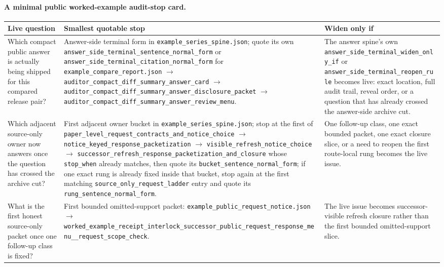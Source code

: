 \documentclass[11pt]{article}
\begin{document}
\paragraph{A minimal public worked-example audit-stop card.}
\begin{table}[t]
\centering
\small
\begin{tabularx}{\linewidth}{@{}Y Y Y@{}}
\toprule
Live question & Smallest quotable stop & Widen only if \\
\midrule
Which compact public answer is actually being shipped for this compared release pair? & Answer-side terminal form in \nolinkurl{example_series_spine.json}; quote its own \texttt{answer\_side\_terminal\_sentence\_normal\_form} or \texttt{answer\_side\_terminal\_citation\_normal\_form} for \nolinkurl{example_compare_report.json} $\to$ \texttt{auditor\_compact\_diff\_summary\_answer\_card} $\to$ \texttt{auditor\_compact\_diff\_summary\_answer\_disclosure\_packet} $\to$ \texttt{auditor\_compact\_diff\_summary\_answer\_review\_menu}. & The answer spine's own \texttt{answer\_side\_terminal\_widen\_only\_if} or \texttt{answer\_side\_terminal\_reopen\_rule} becomes live: exact location, full audit trail, reveal order, or a question that has already crossed the answer-side archive cut. \\
Which adjacent source-only owner now answers once the question has crossed the archive cut? & First adjacent owner bucket in \nolinkurl{example_series_spine.json}; stop at the first of \texttt{paper\_level\_request\_contracts\_and\_notice\_choice} $\to$ \texttt{notice\_keyed\_response\_packetization} $\to$ \texttt{visible\_refresh\_notice\_choice} $\to$ \texttt{successor\_refresh\_response\_packetization\_and\_closure} whose \texttt{stop\_when} already matches, then quote its \texttt{bucket\_sentence\_normal\_form}; if one exact rung is already fixed inside that bucket, stop again at the first matching \texttt{source\_only\_request\_ladder} entry and quote its \texttt{rung\_sentence\_normal\_form}. & One follow-up class, one exact bounded packet, one exact closure slice, or a need to reopen the first route-local rung becomes the live issue. \\
What is the first honest source-only packet once one follow-up class is fixed? & First bounded omitted-support packet: \nolinkurl{example_public_request_notice.json} $\to$ \texttt{worked\_example\_receipt\_interlock\_successor\_public\_request\_response\_menu\_\_request\_scope\_check}. & The live issue becomes successor-visible refresh closure rather than the first bounded omitted-support slice. \\

\end{tabularx}
\end{table}
\end{document}
